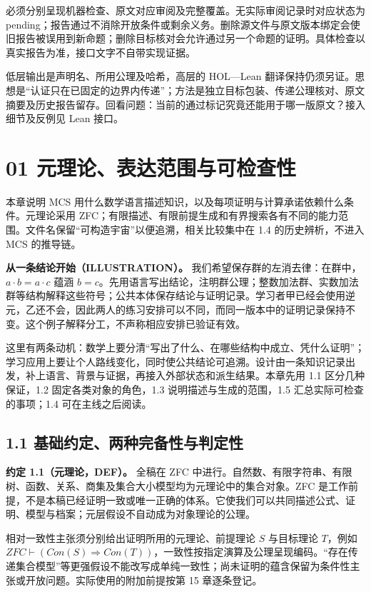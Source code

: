 \documentclass[UTF8,a4paper,zihao=-4,fontset=windows,openany]{ctexbook}
\newcommand{\mcsorigin}[1]{\par\noindent{\small\color{black!55}#1}\par\addvspace{0.8em}}
\def\mathrm#1{#1}%
\begin{document}
必须分别呈现机器检查、原文对应审阅及完整覆盖。无实际审阅记录时对应状态为 pending；报告通过不消除开放条件或剩余义务。删除源文件与原文版本绑定会使旧报告被误用到新命题；删除目标核对会允许通过另一个命题的证明。具体检查以真实报告为准，接口文字不自带实现证据。

低层输出是声明名、所用公理及哈希，高层的 HOL—Lean 翻译保持仍须另证。思想是“认证只在已固定的边界内传递”；方法是独立目标包装、传递公理核对、原文摘要及历史报告留存。回看问题：当前的通过标记究竟还能用于哪一版原文？接入细节及反例见 Lean 接口。

\clearpage\chapter{01 元理论、表达范围与可检查性}
\mcsorigin{原章节：01-元理论与可构造宇宙.md}
本章说明 MCS 用什么数学语言描述知识，以及每项证明与计算承诺依赖什么条件。元理论采用 ZFC；有限描述、有限前提生成和有界搜索各有不同的能力范围。文件名保留“可构造宇宙”以便追溯，相关比较集中在 1.4 的历史辨析，不进入 MCS 的推导链。

\textbf{从一条结论开始（ILLUSTRATION）。} 我们希望保存群的左消去律：在群中，\(a\cdot b=a\cdot c\) 蕴涵 \(b=c\)。先用语言写出结论，注明群公理；整数加法群、实数加法群等结构解释这些符号；公共本体保存结论与证明记录。学习者甲已经会使用逆元，乙还不会，因此两人的练习安排可以不同，而同一版本中的证明记录保持不变。这个例子解释分工，不声称相应安排已验证有效。

这里有两条动机：数学上要分清“写出了什么、在哪些结构中成立、凭什么证明”；学习应用上要让个人路线变化，同时使公共结论可追溯。设计由一条知识记录出发，补上语言、背景与证据，再接入外部状态和派生结果。本章先用 1.1 区分几种保证，1.2 固定各类对象的角色，1.3 说明描述与生成的范围，1.5 汇总实际可检查的事项；1.4 可在主线之后阅读。

\section{1.1 基础约定、两种完备性与判定性}
\textbf{约定 1.1（元理论，DEF）。} 全稿在 ZFC 中进行。自然数、有限字符串、有限树、函数、关系、商集及集合大小模型均为元理论中的集合对象。ZFC 是工作前提，不是本稿已经证明一致或唯一正确的体系。它使我们可以共同描述公式、证明、模型与档案；元层假设不自动成为对象理论的公理。

相对一致性主张须分别给出证明所用的元理论、前提理论 \(S\) 与目标理论 \(T\)，例如 \(\mathrm{ZFC}\vdash(\mathrm{Con}(S)\Rightarrow\mathrm{Con}(T))\)，一致性按指定演算及公理呈现编码。“存在传递集合模型”等更强假设不能改写成单纯一致性；尚未证明的蕴含保留为条件性主张或开放问题。实际使用的附加前提按第 15 章逐条登记。
\end{document}
